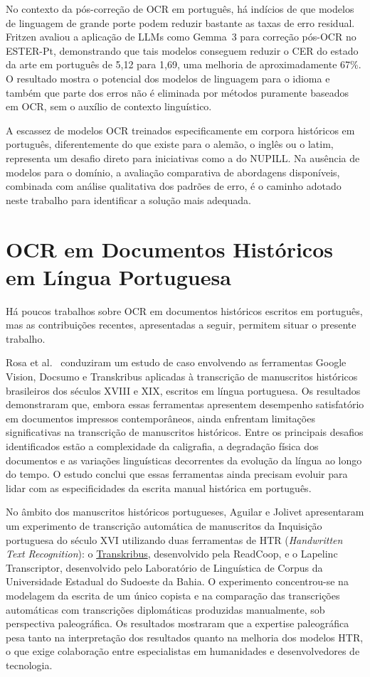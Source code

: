 \documentclass[noabntexcite,oneside]{ufsc-thesis-rn46-2019}
\begin{document}
No contexto da pós-correção de OCR em português, há indícios de que modelos de linguagem
de grande porte podem reduzir bastante as taxas de erro residual. Fritzen
\cite{fritzen2025} avaliou a aplicação de LLMs como
Gemma~3 para correção pós-OCR no ESTER-Pt, demonstrando que tais modelos conseguem
reduzir o CER do estado da arte em português de 5,12 para 1,69, uma melhoria de
aproximadamente 67\%. O resultado mostra o potencial dos modelos de linguagem para o
idioma e também que parte dos erros não é eliminada por métodos puramente baseados em
OCR, sem o auxílio de contexto linguístico.

A escassez de modelos OCR treinados especificamente em corpora históricos em português,
diferentemente do que existe para o alemão, o inglês ou o latim, representa um desafio
direto para iniciativas como a do NUPILL. Na ausência de modelos para o domínio, a
avaliação comparativa de abordagens disponíveis, combinada com análise qualitativa dos
padrões de erro, é o caminho adotado neste trabalho para identificar a solução mais
adequada.

\section{OCR em Documentos Históricos em Língua Portuguesa}
\label{sec:ocr_historico_pt}

Há poucos trabalhos sobre OCR em documentos históricos escritos em português, mas as
contribuições recentes, apresentadas a seguir, permitem situar o presente trabalho.

Rosa et al.\ \cite{rosa2025} conduziram um estudo de caso envolvendo as ferramentas
Google Vision, Docsumo e Transkribus aplicadas à transcrição de manuscritos históricos
brasileiros dos séculos XVIII e XIX, escritos em língua portuguesa. Os resultados
demonstraram que, embora essas ferramentas apresentem desempenho satisfatório em
documentos impressos contemporâneos, ainda enfrentam limitações significativas na
transcrição de manuscritos históricos. Entre os principais desafios identificados estão
a complexidade da caligrafia, a degradação física dos documentos e as variações
linguísticas decorrentes da evolução da língua ao longo do tempo. O estudo conclui que
essas ferramentas ainda precisam evoluir para lidar com as especificidades da escrita
manual histórica em português.

No âmbito dos manuscritos históricos portugueses, Aguilar e Jolivet \cite{aguilar2024}
apresentaram um experimento de transcrição automática de manuscritos da Inquisição
portuguesa do século XVI utilizando duas ferramentas de HTR (\textit{Handwritten Text
Recognition}): o \href{https://www.transkribus.org}{Transkribus}, desenvolvido pela
ReadCoop, e o Lapelinc Transcriptor, desenvolvido pelo Laboratório de Linguística de
Corpus da Universidade Estadual do Sudoeste da Bahia. O experimento concentrou-se na
modelagem da escrita de um único copista e na comparação das transcrições automáticas
com transcrições diplomáticas produzidas manualmente, sob perspectiva paleográfica. Os
resultados mostraram que a expertise paleográfica pesa tanto na interpretação dos
resultados quanto na melhoria dos modelos HTR, o que exige colaboração entre
especialistas em humanidades e desenvolvedores de tecnologia.
\end{document}
